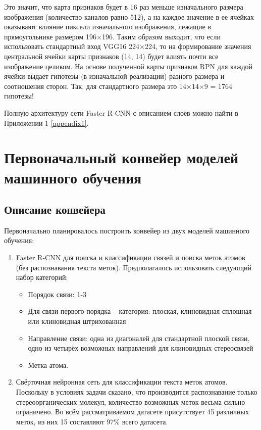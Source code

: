 Это значит, что карта признаков будет в 16 раз меньше изначального размера изображения (количество каналов равно 512), а на каждое значение в ее ячейках оказывают влияние пиксели изначального изображения, лежащие в прямоугольнике размером 196×196. Таким образом выходит, что если использовать стандартный вход VGG16 224×224, то на формирование значения центральной ячейки карты признаков (14, 14) будет влиять почти все изображение целиком. На основе полученной карты признаков RPN для каждой ячейки выдает гипотезы (в изначальной реализации) разного размера и соотношения сторон. Так, для стандартного размера это 14×14×9 = 1764 гипотезы!

Полную архитектуру сети Faster R-CNN с описанием слоёв можно найти в Приложении 1 \ref{appendix1}.

\section{Первоначальный конвейер моделей машинного обучения} \label{ch2:sec2}

\subsection{Описание конвейера}
Первоначально планировалось построить конвейер из двух моделей машинного обучения:
\begin{enumerate}[1.]
	\item Faster R-CNN для поиска и классификации связей и поиска меток атомов (без распознавания текста меток). Предполагалось использовать следующий набор категорий:
	\begin{itemize}
		\item Порядок связи: 1-3
		\item Для связи первого порядка -- категория: плоская, клиновидная сплошная или клиновидная штрихованная
		\item Направление связи: одна из диагоналей для стандартной плоской связи, одно из четырёх возможных направлений для клиновидных стереосвязей
		\item Метка атома.
	\end{itemize}
    \item Свёрточная нейронная сеть для классификации текста меток атомов. Поскольку в условиях задачи сказано, что производится распознавание только стереоорганических молекул, количество возможных меток весьма сильно ограничено. Во всём рассматриваемом датасете присутствует 45 различных меток, из них 15 составляют 97\% всего датасета.
\end{enumerate}

